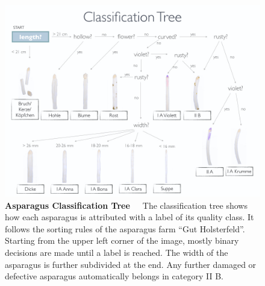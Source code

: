 \begin{figure}[h]
	\centering
	\includegraphics[scale=0.39]{Figures/chapter01/fig_tree_with_title}
	\decoRule
	\caption[Asparagus Classification Tree]{\textbf{Asparagus Classification Tree}~~~The classification tree shows how each asparagus is attributed with a label of its quality class. It follows the sorting rules of the asparagus farm “Gut Holsterfeld”. Starting from the upper left corner of the image, mostly binary decisions are made until a label is reached. The width of the asparagus is further subdivided at the end. Any further damaged or defective asparagus automatically belongs in category II B.}
	\label{fig:LabelTree}
\end{figure}

